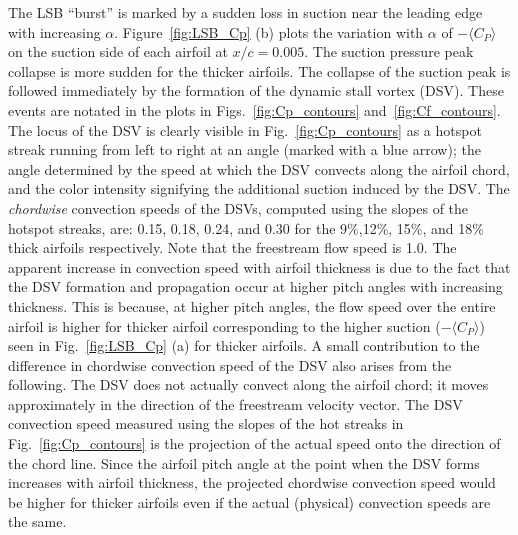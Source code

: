 \documentclass[aps,pra,preprint,groupedaddress]{revtex4-1}
\renewcommand{\=}[1]{\stackrel{#1}{=}} %
\begin{document}
The LSB ``burst'' is marked by a sudden loss in suction near the leading edge
with increasing $\alpha$. Figure~\ref{fig:LSB_Cp} (b) plots the variation with
$\alpha$ of $-\langle C_P \rangle$ on the suction side of each airfoil at
$x/c=0.005$. The suction pressure peak collapse is more sudden for the thicker
airfoils.  The collapse of the suction peak is followed immediately by the
formation of the dynamic stall vortex (DSV). These events are notated in the
plots in Figs.~\ref{fig:Cp_contours} and~\ref{fig:Cf_contours}. The locus of
the DSV is clearly visible in Fig.~\ref{fig:Cp_contours} as a hotspot streak
running from left to right at an angle (marked with a blue arrow); the angle
determined by the speed at which the DSV convects along the airfoil chord, and
the color intensity signifying the additional suction induced by the DSV. The
{\em chordwise} convection speeds of the DSVs, computed using the slopes of the
hotspot streaks, are: 0.15, 0.18, 0.24, and 0.30 for the 9\%,12\%, 15\%, and
18\% thick airfoils respectively.  Note that the freestream flow speed is 1.0.
The apparent increase in convection speed with airfoil thickness is due to the
fact that the DSV formation and propagation occur at higher pitch angles with
increasing thickness. This is because, at higher pitch angles, the flow speed
over the entire airfoil is higher for thicker airfoil corresponding to the
higher suction ($-\langle C_P \rangle$) seen in Fig.~\ref{fig:LSB_Cp} (a) for
thicker airfoils.  A small contribution to the difference in chordwise
convection speed of the DSV also arises from the following. The DSV does not
actually convect along the airfoil chord; it moves approximately in the
direction of the freestream velocity vector. The DSV convection speed measured
using the slopes of the hot streaks in Fig.~\ref{fig:Cp_contours} is the
projection of the actual speed onto the direction of the chord line. Since the
airfoil pitch angle at the point when the DSV forms increases with airfoil
thickness, the projected chordwise convection speed would be higher for thicker
airfoils even if the actual (physical) convection speeds are the same.
%
\end{document}
